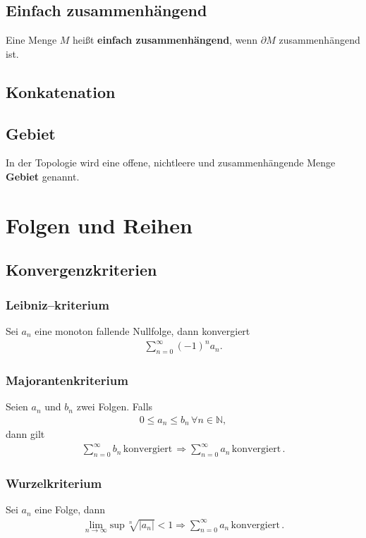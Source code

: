 \documentclass[a4paper,12pt]{article}
\numberwithin{equation}{section}
\begin{document}
\subsection{Einfach zusammenhängend}
Eine Menge $M$ heißt \textbf{einfach zusammenhängend}, wenn $\partial M$ zusammenhängend ist.

\subsection{Konkatenation}

\subsection{Gebiet}
In der Topologie wird eine offene, nichtleere und zusammenhängende Menge \textbf{Gebiet} genannt.


\newpage
\section{Folgen und Reihen}
\subsection{Konvergenzkriterien}
\subsubsection{Leibniz--kriterium}
Sei $a_n$ eine monoton fallende Nullfolge, dann konvergiert
\begin{align} 
        \sum_{n=0}^{\infty}\left(-1\right)^na_n\label{eq:leibniz--kriterium}
.\end{align} 

\subsubsection{Majorantenkriterium}
Seien $a_n$ und $b_n$ zwei Folgen. Falls
\begin{align} 
        0\leq a_n\leq b_n \,\forall n  \in \mathbb{N}
,\end{align} 
dann gilt
\begin{align} 
        \sum_{n=0}^{\infty}b_n \,\text{konvergiert}\,\Rightarrow \sum_{n=0}^{\infty}a_n \,\text{konvergiert}\,\label{eq:majorantenkriterium}
.\end{align} 

\subsubsection{Wurzelkriterium}
Sei $a_n$ eine Folge, dann
\begin{align} 
        \lim_{n\rightarrow \infty}\text{sup}\,\sqrt[n]{|a_n|}<1\Rightarrow \sum_{n=0}^{\infty}a_n \,\text{konvergiert}\,\label{eq:wurzelkriterium}
.\end{align} 
\end{document}
